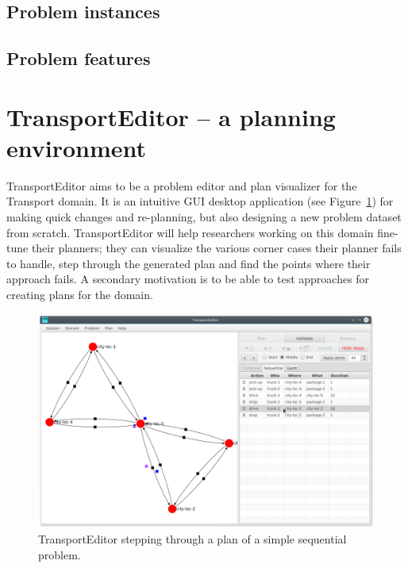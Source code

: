 \subsection{Problem instances}


\subsection{Problem features}



\section{TransportEditor -- a planning environment}

TransportEditor aims to be a problem editor and plan visualizer for the Transport domain.
It is an intuitive GUI desktop application (see Figure~\ref{fig:transporteditor-screenshot}) for making quick changes and re-planning, but also designing a new problem dataset from scratch. TransportEditor will help researchers working on this domain fine-tune their planners; they can visualize the various corner cases their planner fails to handle, step through the generated plan and find the points where their approach fails.
A secondary motivation is to be able to test approaches for creating plans for the domain.

\begin{figure}[htb]
\begin{center}
\includegraphics[width=1.0\textwidth]{../img/transporteditor_screenshot}
\end{center}
\caption{TransportEditor stepping through a plan of a simple sequential problem.}
\label{fig:transporteditor-screenshot}
\end{figure}

